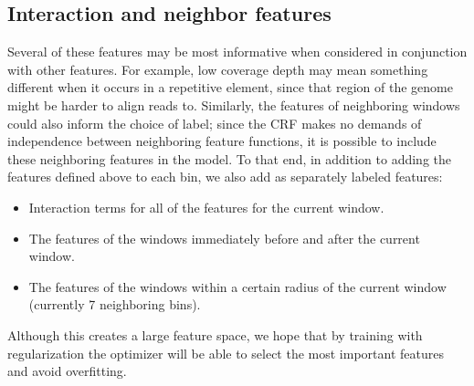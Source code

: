 \subsection{Interaction and neighbor features}

Several of these features may be most informative when considered in conjunction with other features. For example, low coverage depth may mean something different when it occurs in a repetitive element, since that region of the genome might be harder to align reads to. Similarly, the features of neighboring windows could also inform the choice of label; since the CRF makes no demands of independence between neighboring feature functions, it is possible to include these neighboring features in the model. To that end, in addition to adding the features defined above to each bin, we also add as separately labeled features:

\begin{itemize}
\item Interaction terms for all of the features for the current window. 
\item The features of the windows immediately before and after the current window.
\item The features of the windows within a certain radius of the current window (currently 7 neighboring bins).
\end{itemize}

Although this creates a large feature space, we hope that by training with regularization the optimizer will be able to select the most important features and avoid overfitting.

